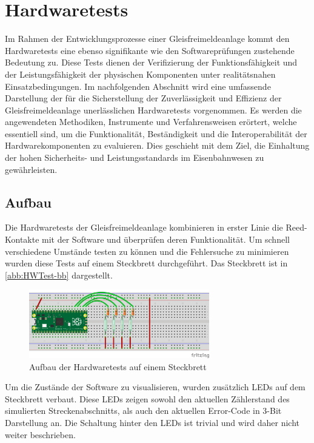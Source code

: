 \section{Hardwaretests}\label{text:Entwicklung-der-GFA:Hardwaretests}

Im Rahmen der Entwicklungsprozesse einer Gleisfreimeldeanlage kommt den Hardwaretests eine ebenso signifikante wie den Softwareprüfungen zustehende Bedeutung zu. Diese Tests dienen der Verifizierung der Funktionsfähigkeit und der Leistungsfähigkeit der physischen Komponenten unter realitätsnahen Einsatzbedingungen. Im nachfolgenden Abschnitt wird eine umfassende Darstellung der für die Sicherstellung der Zuverlässigkeit und Effizienz der Gleisfreimeldeanlage unerlässlichen Hardwaretests vorgenommen. Es werden die angewendeten Methodiken, Instrumente und Verfahrensweisen erörtert, welche essentiell sind, um die Funktionalität, Beständigkeit und die Interoperabilität der Hardwarekomponenten zu evaluieren. Dies geschieht mit dem Ziel, die Einhaltung der hohen Sicherheits- und Leistungsstandards im Eisenbahnwesen zu gewährleisten.

\subsection{Aufbau}

Die Hardwaretests der Gleisfreimeldeanlage kombinieren in erster Linie die Reed-Kontakte mit der Software und überprüfen deren Funktionalität. Um schnell verschiedene Umstände testen zu können und die Fehlersuche zu minimieren wurden diese Tests auf einem Steckbrett durchgeführt. Das Steckbrett ist in \autoref{abb:HWTest-bb} dargestellt.
\begin{figure}[H]
    \centering
    \includegraphics[width=0.7\textwidth]{Assets/Images/4-Entwicklung-der-GFA/Reed-Test_bb.png}
    \caption{Aufbau der Hardwaretests auf einem Steckbrett}\label{abb:HWTest-bb}
\end{figure}

Um die Zustände der Software zu visualisieren, wurden zusätzlich LEDs auf dem Steckbrett verbaut. Diese LEDs zeigen sowohl den aktuellen Zählerstand des simulierten Streckenabschnitts, als auch den aktuellen Error-Code in 3-Bit Darstellung an. Die Schaltung hinter den LEDs ist trivial und wird daher nicht weiter beschrieben.

